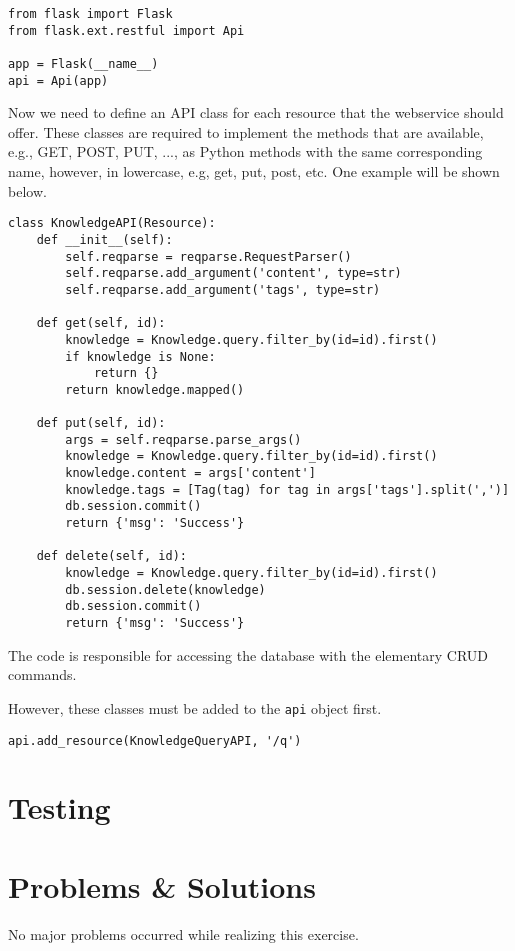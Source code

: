 \documentclass[11pt, a4paper]{article}
\begin{document}
\begin{lstlisting}
from flask import Flask
from flask.ext.restful import Api

app = Flask(__name__)
api = Api(app)
\end{lstlisting}
\vspace{10pt}

Now we need to define an API class for each resource that the webservice should
offer. These classes are required to implement the methods that are available,
e.g., GET, POST, PUT, ..., as Python methods with the same corresponding name,
however, in lowercase, e.g, get, put, post, etc. One example will be shown
below. 

\begin{lstlisting}
class KnowledgeAPI(Resource):
    def __init__(self):
        self.reqparse = reqparse.RequestParser()
        self.reqparse.add_argument('content', type=str)
        self.reqparse.add_argument('tags', type=str)

    def get(self, id):
        knowledge = Knowledge.query.filter_by(id=id).first()
        if knowledge is None:
            return {}
        return knowledge.mapped()

    def put(self, id):
        args = self.reqparse.parse_args()
        knowledge = Knowledge.query.filter_by(id=id).first()
        knowledge.content = args['content']
        knowledge.tags = [Tag(tag) for tag in args['tags'].split(',')]
        db.session.commit()
        return {'msg': 'Success'}

    def delete(self, id):
        knowledge = Knowledge.query.filter_by(id=id).first()
        db.session.delete(knowledge)
        db.session.commit()
        return {'msg': 'Success'}
\end{lstlisting}

\vspace{10pt}

The code is responsible for accessing the database with the elementary CRUD
commands. 

However, these classes must be added to the \lstinline|api| object first. 

\begin{lstlisting}
api.add_resource(KnowledgeQueryAPI, '/q')
\end{lstlisting}

\subsection{}

\section{Testing}


\section{Problems \& Solutions}

No major problems occurred while realizing this exercise.

\nocite{*}


\end{document}
